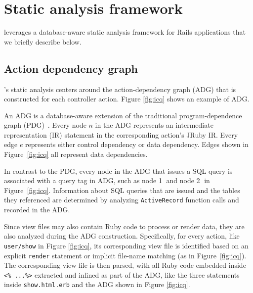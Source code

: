 \section{Static analysis framework}
\label{sec:frame}

\ToolP leverages a database-aware static analysis framework for 
Rails applications that we briefly describe below.

\subsection{Action dependency graph}
\ToolP's static analysis centers around the
action-dependency graph (ADG) that is constructed for each controller action.
Figure \ref{fig:icq} shows an example of ADG.

An ADG is a database-aware extension 
of the traditional program-dependence graph (PDG)~\cite{ferrante1987program}.
Every node $n$ in the ADG represents an intermediate representation (IR)
statement in the corresponding action's JRuby \cite{jruby} IR.
Every edge $e$
represents either control dependency or data dependency. Edges shown in 
Figure~\ref{fig:icq} all represent data dependencies.

In contrast to the PDG, 
every node in the ADG that issues a SQL query is associated with a query tag in ADG, such as
node {\large \textcircled{\small 1}} and node {\large \textcircled{\small 2}} in Figure~\ref{fig:icq}. 
Information about SQL queries that are issued and the tables they referenced are determined by analyzing  {\tt ActiveRecord} function calls and recorded in the ADG.


Since view files may also contain Ruby code to process or render data, %
they are also analyzed during the ADG construction. Specifically, for every action, like
{\tt user/show} in Figure \ref{fig:icq}, its corresponding view file is identified based on an 
explicit {\tt render} statement or implicit file-name matching (as in
Figure~\ref{fig:icq}). The corresponding view file is then parsed, with all Ruby code embedded
inside {\tt <\% ...\%>} extracted and inlined as part of the ADG,
like the three statements
inside {\tt show.html.erb} and the ADG shown in Figure \ref{fig:icq}. 

